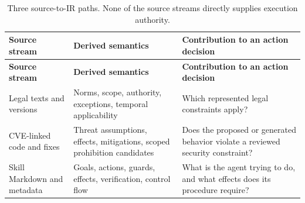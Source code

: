 \begingroup
\renewcommand{\thetable}{1}
\begin{longtable}{@{}>{\raggedright\arraybackslash}p{.24\linewidth} >{\raggedright\arraybackslash}p{.32\linewidth} >{\raggedright\arraybackslash}p{.38\linewidth}@{}}
\caption{Three source-to-IR paths. None of the source streams directly supplies execution authority.}\label{tab:1}\\
\toprule
\textbf{Source stream} & \textbf{Derived semantics} & \textbf{Contribution to an action decision} \\
\midrule
\endfirsthead
\textbf{Source stream} & \textbf{Derived semantics} & \textbf{Contribution to an action decision} \\
\midrule
\endhead
\bottomrule
\endlastfoot
Legal texts and versions & Norms, scope, authority, exceptions, temporal applicability & Which represented legal constraints apply? \\[3pt]
CVE-linked code and fixes & Threat assumptions, effects, mitigations, scoped prohibition candidates & Does the proposed or generated behavior violate a reviewed security constraint? \\[3pt]
Skill Markdown and metadata & Goals, actions, guards, effects, verification, control flow & What is the agent trying to do, and what effects does its procedure require? \\[3pt]
\end{longtable}
\endgroup
